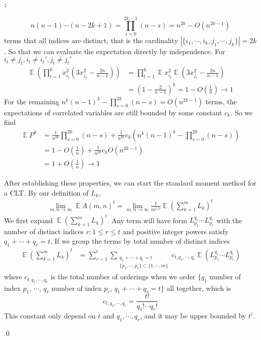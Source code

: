 \documentclass[12pt]{extarticle}
\renewenvironment{proof}[1][\proofname]{ { \it\bfseries #1: }}{\qed}
\newcommand{\1}{\field{1}}
\DeclareMathOperator{\E}{\mathbb{E}}
\numberwithin{equation}{section}
\begin{document}
\begin{proof}
\begin{enumerate}[label={(\arabic*)}]
\[
n(n-1)\cdots (n-2k+1)= \prod_{s=0}^{2k-1}(n-s) = n^{2k} -O(n^{2k-1})
\]
terms that all indices are distinct, that is the cardinality $|\{i_1,\cdots, i_k, j_1,\cdots, j_k\}|=2k$. So that we can evaluate the expectation directly by independence. For $i_t \ne j_t, i_t\ne i_t', j_t\ne j_t'$
\begin{align*}
     \E \left( \prod_{t=1}^k x_{i_t}^2(3x_{j_t}^2-\frac{2n}{n-1})\right) 
     & = \prod_{t=1}^k \E x_{i_t}^2 \E (3x_{j_t}^2-\frac{2n}{n-1})  \\
     & =(1- \frac{2}{n-1})^k  = 1-O(\frac{1}{n}) \to 1
\end{align*}
For the remaining $n^k(n-1)^k - \prod_{s=0}^{2k}(n-s)=O(n^{2k-1})$ terms, the expectations of correlated variables are still bounded by some constant $c_k$. So we find 
\begin{align*}
    \E P^k 
    & = \frac{1}{n^{2k}} \prod_{s=0}^{2k}(n-s) + \frac{1}{n^{2k}} c_k\left( n^k(n-1)^k - \prod_{s=0}^{2k}(n-s)\right) \\
    &= 1-O(\frac{1}{n}) + \frac{1}{n^{2k}} c_k O(n^{2k-1}) \\
    & = 1+ O(\frac{1}{n})
    \to 1
\end{align*}
\end{enumerate}
\vspace{2em}
\bigskip
After establishing these properties, we can start the standard moment method for a CLT. By our definition of $L_k$, 
\begin{align*}
    \lim_{m,n\to \infty} \E A(m,n)^t
=\lim_{m,n\to \infty} \frac{1}{m^{t/2}} \E \left(\sum_{k=1}^m L_k \right)^t
\end{align*}
We first expand $\E \left(\sum_{k=1}^m L_k \right)^t$. Any term will have form $L_{p_1}^{q_1} \cdots L_{p_r}^{q_r}$ with the number of distinct indices $r: 1\le r \le t$ and positive integer powers satisfy $q_1+ \cdots +q_r = t$. If we group the terms by total number of distinct indices
\begin{align*}
    \E \left(\sum_{k=1}^m L_k \right)^t
    & = \sum_{r=1}^t \sum_{\substack{q_1+ \cdots +q_r = t\\ \{p_1,\cdots, p_r\}\subset \{1,\cdots,m\} }} c_{t,q_1,\cdots,q_r}\E (L_{p_1}^{q_1} \cdots L_{p_r}^{q_r})
\end{align*}
where $c_{t,q_1,\cdots,q_r}$ is the total number of orderings when we order $\{q_1$ number of index $p_1$, $\cdots$, $q_r$ number of index $p_r$, $q_1+ \cdots +q_r = t\}$ all together, which is 
\[
c_{t,q_1,\cdots,q_r} = \frac{t!}{q_1!\cdots q_r!}
\]
This constant only depend on $t$ and $q_1, \cdots, q_r$, and it may be upper bounded by $t^t$. 


\end{proof}
\end{document}
